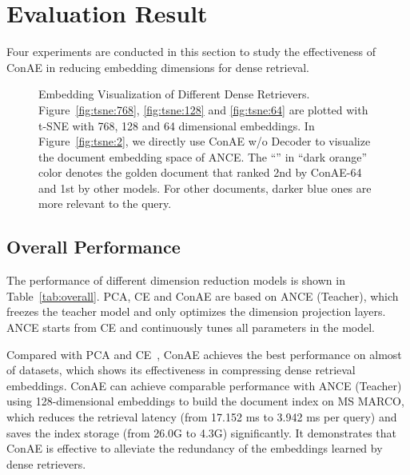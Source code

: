 \documentclass[11pt]{article}
\begin{document}
 \section{Evaluation Result}
Four experiments are conducted in this section to study the effectiveness of ConAE in reducing embedding dimensions for dense retrieval.

\begin{figure*}[t]
    \centering
    \caption{Embedding Visualization of Different Dense Retrievers. Figure~\ref{fig:tsne:768}, \ref{fig:tsne:128} and \ref{fig:tsne:64} are plotted with t-SNE with 768, 128 and 64 dimensional embeddings. In Figure~\ref{fig:tsne:2}, we directly use ConAE w/o Decoder to visualize the document embedding space of ANCE. The ``'' in ``dark orange'' color denotes the golden document that ranked 2nd by ConAE-64 and 1st by other models. For other documents, darker blue ones are more relevant to the query.}
    \label{fig:tsne}
\end{figure*} 
\subsection{Overall Performance}\label{sec:overall}
The performance of different dimension reduction models is shown in Table~\ref{tab:overall}. PCA, CE and ConAE are based on ANCE (Teacher), which freezes the teacher model and only optimizes the dimension projection layers. ANCE starts from CE and continuously tunes all parameters in the model.

Compared with PCA and CE~\cite{ma2021simple}, ConAE achieves the best performance on almost of datasets, which shows its effectiveness in compressing dense retrieval embeddings. ConAE can achieve comparable performance with ANCE (Teacher) using 128-dimensional embeddings to build the document index on MS MARCO, which reduces the retrieval latency (from 17.152 ms to 3.942 ms per query) and saves the index storage (from 26.0G to 4.3G) significantly. It demonstrates that ConAE is effective to alleviate the redundancy of the embeddings learned by dense retrievers.
\end{document}
